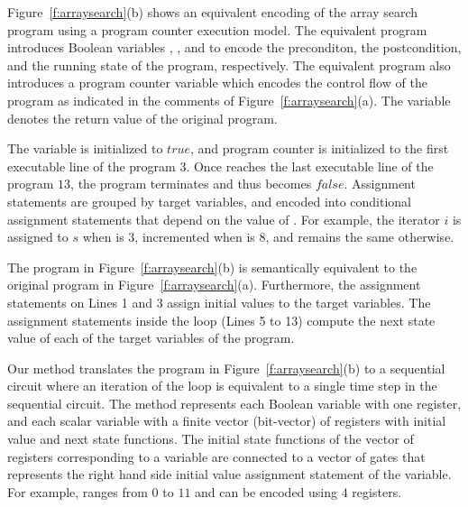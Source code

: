 Figure~\ref{f:arraysearch}(b) shows an equivalent encoding of the array search 
program using a program counter execution model. 
The equivalent program introduces Boolean variables , , and 
 to encode the preconditon, the postcondition, and the running
state of the program, respectively. 
The equivalent program also introduces a program counter variable
 which encodes the control flow of the program as indicated in 
the comments of Figure~\ref{f:arraysearch}(a). 
The  variable denotes the return value of the original program. 

The  variable is initialized to $true$, and  
program counter is initialized to the first executable line of the program $3$. 
Once  reaches the last executable line of the program $13$, 
the program terminates and thus  becomes $false$. 
Assignment statements are grouped by target variables, and encoded
into conditional assignment statements that depend on the value of . 
For example, the iterator $i$ is assigned to $s$ when  is $3$, incremented
when  is $8$, and remains the same otherwise. 

The program in Figure~\ref{f:arraysearch}(b) is semantically equivalent to the original
program in Figure~\ref{f:arraysearch}(a). 
Furthermore, the assignment statements on Lines 1 and 3 assign initial values to the 
target variables. 
The assignment statements inside the  loop (Lines 5 to 13) compute 
the next state value of each of the target variables of the program. 

Our method translates the program in Figure~\ref{f:arraysearch}(b) to a sequential 
circuit where an iteration of the  loop
is equivalent to a single time step in the sequential circuit. 
The method represents each Boolean variable with one register, and each scalar 
variable with a finite vector (bit-vector) of registers 
with initial value and next state functions. 
The initial state functions of the vector of registers corresponding to
a variable are connected to a vector of gates that represents the right hand 
side initial value assignment statement of the variable. 
For example, 
 ranges from $0$ to $11$ and can be encoded using $4$ registers.



